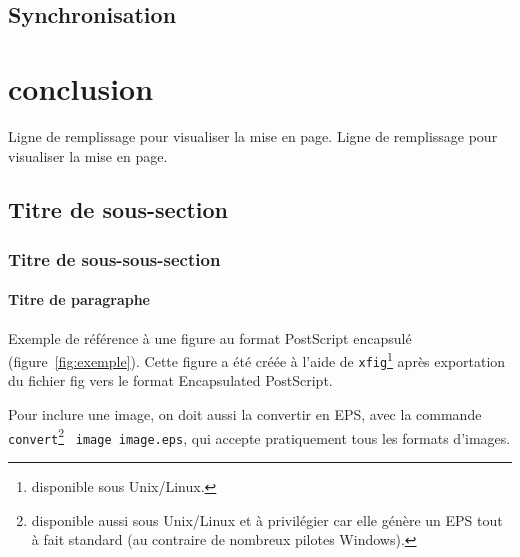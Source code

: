 \documentclass[a4paper,11pt]{article}
\begin{document}
\subsection{Synchronisation}  

\section{conclusion}

Ligne de remplissage pour visualiser la mise en page. Ligne de
remplissage pour visualiser la mise en page. 

\subsection{Titre de sous-section}
\subsubsection{Titre de sous-sous-section}
\paragraph{Titre de paragraphe}

Exemple de référence à une figure au format PostScript encapsulé
(figure~\ref{fig:exemple}). Cette figure a été créée à l'aide de
\texttt{xfig}\footnote{disponible sous Unix/Linux.} après exportation 
du fichier fig vers le format Encapsulated PostScript.



Pour inclure une image, on doit aussi la convertir en EPS, avec
la commande \texttt{convert}\footnote{
disponible aussi sous Unix/Linux et à privilégier 
car elle génère un EPS tout à fait standard 
(au contraire de nombreux pilotes Windows).}
\texttt{~image image.eps}, qui accepte pratiquement tous les formats d'images.
\end{document}
